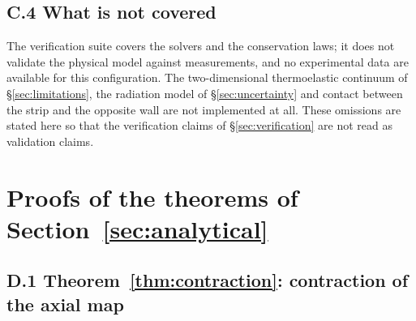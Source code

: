 \documentclass[11pt,a4paper]{article}
\begin{document}
\subsection*{C.4 What is not covered}

The verification suite covers the solvers and the conservation laws; it does
not validate the physical model against measurements, and no experimental data
are available for this configuration. The two-dimensional thermoelastic
continuum of \S\ref{sec:limitations}, the radiation model of
\S\ref{sec:uncertainty} and contact between the strip and the opposite wall
are not implemented at all. These omissions are stated here so that the
verification claims of \S\ref{sec:verification} are not read as validation
claims.

\section{Proofs of the theorems of Section~\ref{sec:analytical}}
\label{app:proofs}

\subsection*{D.1 Theorem~\ref{thm:contraction}: contraction of the axial map}
\end{document}
